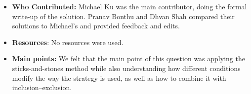 \documentclass{article}
\begin{document}
\begin{itemize}
\item \textbf{Who Contributed:} Michael Ku was the main contributor, doing the formal write-up of the solution. Pranav Bonthu and Dhvan Shah compared their solutions to Michael's and provided feedback and edits.
\item \textbf{Resources}: No resources were used.
\item \textbf{Main points:} We felt that the main point of this question was applying the sticks-and-stones method while also understanding how different conditions modify the way the strategy is used, as well as how to combine it with inclusion–exclusion.
\end{itemize}
\end{document}
